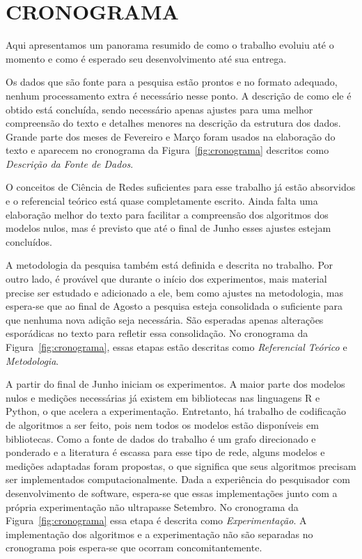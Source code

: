 \documentclass[12pt,a4paper,final]{article}
\begin{document}
\section{CRONOGRAMA}

Aqui apresentamos um panorama resumido de como o trabalho evoluiu até o momento e como é esperado seu desenvolvimento até sua entrega.

Os dados que são fonte para a pesquisa estão prontos e no formato adequado, nenhum processamento extra é necessário nesse ponto. A descrição de como ele é obtido está concluída, sendo necessário apenas ajustes para uma melhor compreensão do texto e detalhes menores na descrição da estrutura dos dados. Grande parte dos meses de Fevereiro e Março foram usados na elaboração do texto e aparecem no cronograma da Figura~\ref{fig:cronograma} descritos como \textit{Descrição da Fonte de Dados}.

O conceitos de Ciência de Redes suficientes para esse trabalho já estão absorvidos e o referencial teórico está quase completamente escrito. Ainda falta uma elaboração melhor do texto para facilitar a compreensão dos algoritmos dos modelos nulos, mas é previsto que até o final de Junho esses ajustes estejam concluídos.

A metodologia da pesquisa também está definida e descrita no trabalho. Por outro lado, é provável que durante o início dos experimentos, mais material precise ser estudado e adicionado a ele, bem como ajustes na metodologia, mas espera-se que ao final de Agosto a pesquisa esteja consolidada o suficiente para que nenhuma nova adição seja necessária. São esperadas apenas alterações esporádicas no texto para refletir essa consolidação. No cronograma da Figura~\ref{fig:cronograma}, essas etapas estão descritas como \textit{Referencial Teórico} e \textit{Metodologia}.

A partir do final de Junho iniciam os experimentos. A maior parte dos modelos nulos e medições necessárias já existem em bibliotecas nas linguagens R e Python, o que acelera a experimentação. Entretanto, há trabalho de codificação de algoritmos a ser feito, pois nem todos os modelos estão disponíveis em bibliotecas. Como a fonte de dados do trabalho é um grafo direcionado e ponderado e a literatura é escassa para esse tipo de rede, alguns modelos e medições adaptadas foram propostas, o que significa que seus algoritmos precisam ser implementados computacionalmente. Dada a experiência do pesquisador com desenvolvimento de software, espera-se que essas implementações junto com a própria experimentação não ultrapasse Setembro. No cronograma da Figura~\ref{fig:cronograma} essa etapa é descrita como \textit{Experimentação}. A implementação dos algoritmos e a experimentação não são separadas no cronograma pois espera-se que ocorram concomitantemente.
\end{document}
